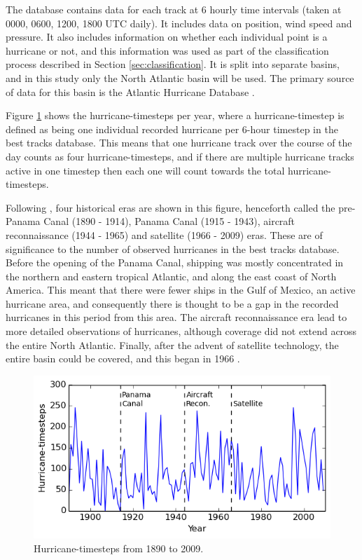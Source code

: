 \documentclass[pdftex,12pt,a4paper]{report}
\begin{document}
The database contains data for each track at 6 hourly time intervals (taken at 0000, 0600, 1200, 1800
UTC daily). It includes data on position, wind speed and pressure. It also includes information on
whether each individual point is a hurricane or not, and this information was used as part of the
classification process described in Section \ref{sec:classification}. It is split into separate
basins, and in this study only the North Atlantic basin will be used. The primary source of
data for this basin is the Atlantic Hurricane Database \parencite[HURDAT;][]{jarvinen1984tropical}.


Figure \ref{fig:hurr_per_year} shows the hurricane-timesteps per year, where a hurricane-timestep is
defined as being one individual recorded hurricane per 6-hour timestep in the best tracks database.
This means that one hurricane track over the course of the day counts as four hurricane-timesteps,
and if there are multiple hurricane tracks active in one timestep then each one will count towards
the total hurricane-timesteps. 

Following \textcite{vecchi2008estimates}, four historical eras are shown in this figure, henceforth
called the pre-Panama Canal (1890 - 1914), Panama Canal (1915 - 1943), aircraft reconnaissance (1944
- 1965) and satellite (1966 - 2009) eras.  These are of significance to the number of observed
hurricanes in the best tracks database. Before the opening of the Panama Canal, shipping was
mostly concentrated in the northern and eastern tropical Atlantic, and along the east coast of North
America. This meant that there were fewer ships in the Gulf of Mexico, an active hurricane area, and
consequently there is thought to be a gap in the recorded hurricanes in this period from this area.
The aircraft reconnaissance era lead to more detailed observations of hurricanes, although coverage
did not extend across the entire North Atlantic. Finally, after the advent of satellite technology,
the entire basin could be covered, and this began in 1966 \parencite{landsea2007counting}.

\begin{figure}[hb!]
    \centering
    \includegraphics[width=\textwidth]{figures/hurr_per_year}
    \caption{Hurricane-timesteps from 1890 to 2009.}
    \label{fig:hurr_per_year}
\end{figure}
\end{document}
